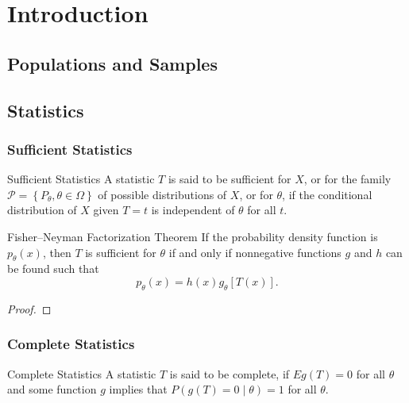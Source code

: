 \chapter{Introduction}

\section{Populations and Samples}

\section{Statistics}

\subsection{Sufficient Statistics}

\begin{definition}{Sufficient Statistics}{}
    A statistic $T$ is said to be sufficient for $X$, or for the family $\mathcal{P}=\left\{P_{\theta}, \theta \in \Omega\right\}$ of possible distributions of $X$, or for $\theta$, if the conditional distribution of $X$ given $T=t$ is independent of $\theta$ for all $t$.
\end{definition}

\begin{theorem}{Fisher–Neyman Factorization Theorem}{}
    If the probability density function is $p_{\theta}(x)$, then $T$ is sufficient for $\theta$ if and only if nonnegative functions $g$ and $h$ can be found such that
    \begin{equation*}
        p_{\theta}(x)=h(x)g_{\theta}[T(x)].
    \end{equation*}
\end{theorem}

\begin{proof}

\end{proof}

\subsection{Complete Statistics}

\begin{definition}{Complete Statistics}{}
    A statistic $T$ is said to be complete, if $Eg(T)=0$ for all $\theta$ and some function $g$ implies that $P(g(T)=0\mid\theta)=1$ for all $\theta$.
\end{definition}

